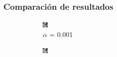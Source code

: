 \documentclass[11pt]{beamer}
\begin{document}
\begin{frame}
\frametitle{Comparación de resultados}

\begin{figure}[H]
    \centering
    \begin{subfigure}[h]{0.3\textwidth} 
        \includegraphics[width=\textwidth]{img/tomo_ruido001.png}
        \caption{$\alpha$ = 0.001}
        \label{fig: alpha = 0.001}
    \end{subfigure}%
    \hfill
    \begin{subfigure}[h]{0.30\textwidth}
        \includegraphics[width=\textwidth]{img/tomo_ruido005.png}

\end{subfigure}
\end{figure}
\end{frame}
\end{document}
